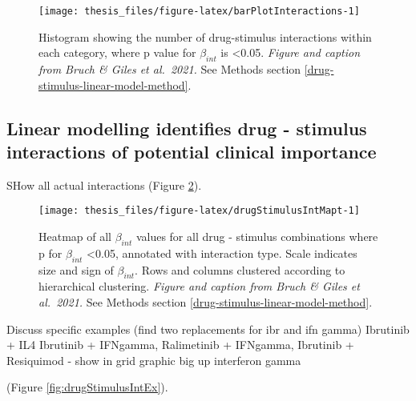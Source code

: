 \documentclass[11pt, a4paper, twosided]{book}
\begin{document}
\begin{figure}

{\centering \texttt{[image: thesis\_files/figure-latex/barPlotInteractions-1]} 

}

\caption{Histogram showing the number of drug-stimulus interactions within each category, where p value for \(\beta_{int}\) is \textless0.05. \emph{Figure and caption from Bruch \& Giles et al.~2021.} See Methods section \ref{drug-stimulus-linear-model-method}.}\label{fig:barPlotInteractions}
\end{figure}
\hypertarget{ID}{%
\subsection{Linear modelling identifies drug - stimulus interactions of potential clinical importance}\label{ID}}

SHow all actual interactions
(Figure \ref{fig:drugStimulusIntMapt}).


\begin{figure}

{\centering \texttt{[image: thesis\_files/figure-latex/drugStimulusIntMapt-1]} 

}

\caption{Heatmap of all \(\beta_{int}\) values for all drug - stimulus combinations where p for \(\beta_{int}\) \textless0.05, annotated with interaction type. Scale indicates size and sign of \(\beta_{int}\). Rows and columns clustered according to hierarchical clustering. \emph{Figure and caption from Bruch \& Giles et al.~2021.} See Methods section \ref{drug-stimulus-linear-model-method}.}\label{fig:drugStimulusIntMapt}
\end{figure}
Discuss specific examples
(find two replacements for ibr and ifn gamma)
Ibrutinib + IL4 Ibrutinib + IFNgamma, Ralimetinib + IFNgamma, Ibrutinib + Resiquimod - show in grid graphic
big up interferon gamma

(Figure \ref{fig:drugStimulusIntEx}).
\end{document}
